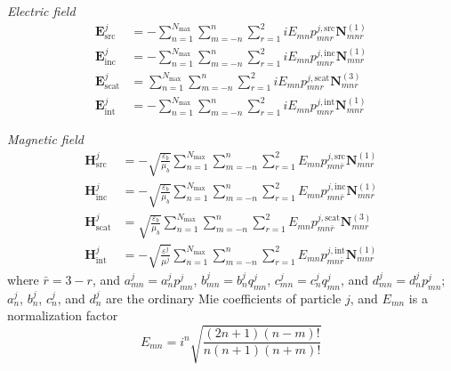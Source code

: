 \documentclass[11pt]{article}
\begin{document}
\textit{Electric field}
\begin{subequations}
\begin{align}
    \boldsymbol{E}_\text{src}^j &= - \sum_{n=1}^{N_\text{max}} \sum_{m=-n}^{n} \sum_{r=1}^2
    iE_{mn} p_{mnr}^{j,\text{src}} \boldsymbol{N}_{mnr}^{(1)} \\
    \boldsymbol{E}_\text{inc}^j &= - \sum_{n=1}^{N_\text{max}} \sum_{m=-n}^{n} \sum_{r=1}^2
    iE_{mn} p_{mnr}^{j,\text{inc}} \boldsymbol{N}_{mnr}^{(1)} \\
    \boldsymbol{E}_\text{scat}^j &= \sum_{n=1}^{N_\text{max}} \sum_{m=-n}^{n} \sum_{r=1}^2
    iE_{mn} p_{mnr}^{j,\text{scat}} \boldsymbol{N}_{mnr}^{(3)} \\
    \boldsymbol{E}_\text{int}^j &= - \sum_{n=1}^{N_\text{max}} \sum_{m=-n}^{n} \sum_{r=1}^2
    iE_{mn} p_{mnr}^{j,\text{int}} \boldsymbol{N}_{mnr}^{(1)}
\end{align}
\label{eqn:electric_field_expansion}
\end{subequations}

\textit{Magnetic field}
\begin{subequations}
\begin{align}
    \boldsymbol{H}_\text{src}^j &= - \sqrt{\frac{\varepsilon_b}{\mu_b}} \sum_{n=1}^{N_\text{max}} \sum_{m=-n}^{n} \sum_{r=1}^2
    E_{mn} p_{mn\bar r}^{j,\text{src}} \boldsymbol{N}_{mnr}^{(1)} \\
    \boldsymbol{H}_\text{inc}^j &= - \sqrt{\frac{\varepsilon_b}{\mu_b}} \sum_{n=1}^{N_\text{max}} \sum_{m=-n}^{n} \sum_{r=1}^2
    E_{mn} p_{mn\bar r}^{j,\text{inc}} \boldsymbol{N}_{mnr}^{(1)} \\
    \boldsymbol{H}_\text{scat}^j &= \sqrt{\frac{\varepsilon_b}{\mu_b}} \sum_{n=1}^{N_\text{max}} \sum_{m=-n}^{n} \sum_{r=1}^2
    E_{mn} p_{mn\bar r}^{j,\text{scat}} \boldsymbol{N}_{mnr}^{(3)} \\
    \boldsymbol{H}_\text{int}^j &= - \sqrt{\frac{\varepsilon^j}{\mu^j}} \sum_{n=1}^{N_\text{max}} \sum_{m=-n}^{n} \sum_{r=1}^2
    E_{mn} p_{mn\bar r}^{j,\text{int}} \boldsymbol{N}_{mnr}^{(1)}
\end{align}
\label{eqn:magnetic_field_expansion}
\end{subequations}
where $\bar r = 3-r$,  and $a_{mn}^j = a_n^j p_{mn}^j$, $b_{mn}^j = b_n^j q_{mn}^j$, $c_{mn}^j = c_n^j q_{mn}^j$, and $d_{mn}^j = d_n^j p_{mn}^j$; $a_n^j$, $b_n^j$, $c_n^j$, and $d_n^j$ are the ordinary Mie coefficients \cite{bohren2008absorption} of particle $j$, and $E_{mn}$ is a normalization factor
\begin{equation}
    E_{mn} = i^n \sqrt{\frac{(2n+1)(n-m)!}{n(n+1)(n+m)!}}
\end{equation}
\end{document}
